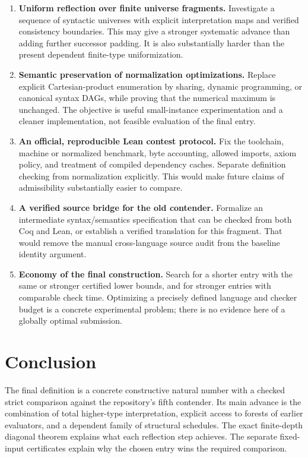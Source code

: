\documentclass[11pt,a4paper]{article}
\theoremstyle{definition}
\begin{document}
\begin{enumerate}[label=\textbf{\arabic*.},leftmargin=*]
\item \textbf{Uniform reflection over finite universe fragments.}
Investigate a sequence of syntactic universes with explicit interpretation
maps and verified consistency boundaries. This may give a stronger systematic
advance than adding further successor padding. It is also substantially
harder than the present dependent finite-type uniformization.

\item \textbf{Semantic preservation of normalization optimizations.}
Replace explicit Cartesian-product enumeration by sharing, dynamic
programming, or canonical syntax DAGs, while proving that the numerical
maximum is unchanged. The objective is useful small-instance experimentation
and a cleaner implementation, not feasible evaluation of the final entry.

\item \textbf{An official, reproducible Lean contest protocol.}
Fix the toolchain, machine or normalized benchmark, byte accounting, allowed
imports, axiom policy, and treatment of compiled dependency caches. Separate
definition checking from normalization explicitly. This would make future
claims of admissibility substantially easier to compare.

\item \textbf{A verified source bridge for the old contender.}
Formalize an intermediate syntax/semantics specification that can be checked
from both Coq and Lean, or establish a verified translation for this fragment.
That would remove the manual cross-language source audit from the baseline
identity argument.

\item \textbf{Economy of the final construction.}
Search for a shorter entry with the same or stronger certified lower bounds,
and for stronger entries with comparable check time. Optimizing a precisely
defined language and checker budget is a concrete experimental problem;
there is no evidence here of a globally optimal submission.
\end{enumerate}

\section{Conclusion}

The final definition is a concrete constructive natural number with a checked
strict comparison against the repository's fifth contender. Its main advance
is the combination of total higher-type interpretation, explicit access to
forests of earlier evaluators, and a dependent family of structural schedules.
The exact finite-depth diagonal theorem explains what each reflection step
achieves. The separate fixed-input certificates explain why the chosen entry
wins the required comparison.
\end{document}
